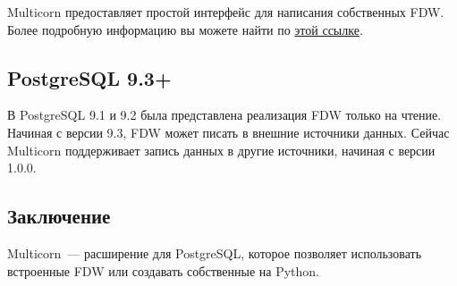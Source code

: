 Multicorn предоставляет простой интерфейс для написания собственных FDW. Более подробную информацию вы можете найти по \href{http://multicorn.org/implementing-an-fdw/}{этой ссылке}.


\subsection{PostgreSQL 9.3+}

В PostgreSQL 9.1 и 9.2 была представлена реализация FDW только на чтение. Начиная с версии 9.3, FDW может писать в внешние источники данных. Сейчас Multicorn поддерживает запись данных в другие источники, начиная с версии 1.0.0.

\subsection{Заключение}

Multicorn~--- расширение для PostgreSQL, которое позволяет использовать встроенные FDW или создавать собственные на Python.
